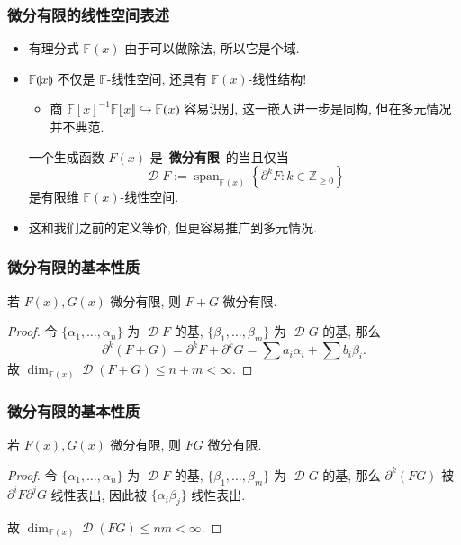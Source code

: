 \documentclass{ctexbeamer}
\newcommand{\bbF}{\mathbb F}
\newcommand{\bbZ}{\mathbb Z}
\DeclareMathOperator{\Span}{span}
\DeclareMathOperator{\calD}{\mathcal D}
\begin{document}
\begin{frame}
  \frametitle{微分有限的线性空间表述}

  \begin{itemize}
    \item 有理分式 $\bbF(x)$ 由于可以做除法, 所以它是个域.
    \item $\bbF\llparenthesis x \rrparenthesis$ 不仅是 $\bbF$-线性空间, 还具有 $\bbF(x)$-线性结构!
    \begin{itemize}
      \item 商 $\bbF[x]^{-1}\bbF\llbracket x\rrbracket \hookrightarrow \bbF\llparenthesis x \rrparenthesis$ 
      容易识别, 这一嵌入进一步是同构, 但在多元情况并不典范.
    \end{itemize}
    \begin{definition}[微分有限]
      一个生成函数 $F(x)$ 是~\textbf{微分有限}~的当且仅当
      \begin{equation}
        \calD F := \Span_{\bbF(x)} \left\{ \partial^k F : k \in \bbZ_{\geq 0} \right\}
      \end{equation}
      是有限维 $\bbF(x)$-线性空间.
    \end{definition}
    \item 这和我们之前的定义等价, 但更容易推广到多元情况.
  \end{itemize}

\end{frame}

\begin{frame}
  \frametitle{微分有限的基本性质}

  \begin{theorem}
    若 $F(x), G(x)$ 微分有限, 则 $F+G$ 微分有限.
  \end{theorem}
  \begin{proof}
    令 $\{\alpha_1,\dots,\alpha_n\}$ 为 $\calD F$ 的基, $\{\beta_1,\dots,\beta_m\}$ 为 $\calD G$ 的基, 那么
    \begin{equation}
      \partial^k (F+G) = \partial^k F + \partial^k G = \sum a_i \alpha_i + \sum b_i \beta_i.
    \end{equation}
    故 $\dim_{\bbF(x)} \calD(F+G) \leq n+m < \infty$.
  \end{proof}

\end{frame}

\begin{frame}
  \frametitle{微分有限的基本性质}

  \begin{theorem}
    若 $F(x), G(x)$ 微分有限, 则 $FG$ 微分有限.
  \end{theorem}
  \begin{proof}
    令 $\{\alpha_1,\dots,\alpha_n\}$ 为 $\calD F$ 的基, $\{\beta_1,\dots,\beta_m\}$ 为 $\calD G$ 的基, 那么
    $\partial^k(FG)$ 被 $\partial^i F \partial^j G$ 线性表出, 因此被 $\{\alpha_i \beta_j\}$ 线性表出.
    
    故 $\dim_{\bbF(x)} \calD(FG) \leq nm < \infty$.
  \end{proof}

\end{frame}
\end{document}
